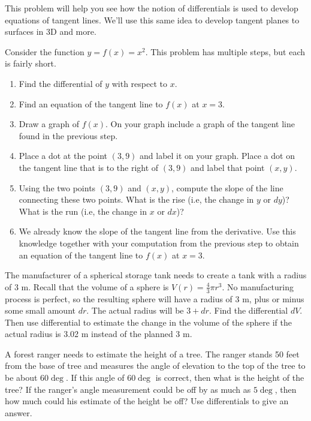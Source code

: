 This problem will help you see how the notion of differentials is used to develop equations of tangent lines. We'll use this same idea to develop tangent planes to surfaces in 3D and more.
\begin{problem} \label{differentials give tangent lines}
Consider the function $y=f(x) = x^2$. This problem has multiple steps, but each is fairly short.
\begin{enumerate}
\item Find the differential of $y$ with respect to $x$.  
\item Find an equation of the tangent line to $f(x)$ at $x=3$. 
\item Draw a graph of $f(x)$. On your graph include a graph of the tangent line found in the previous step. 
\item Place a dot at the point $(3,9)$ and label it on your graph. Place a dot on the tangent line that is to the right of $(3,9)$ and label that point $(x,y)$. 
\item Using the two points $(3,9)$ and $(x,y)$, compute the slope of the line connecting these two points. What is the rise (i.e, the change in $y$ or $dy$)? What is the run (i.e, the change in $x$ or $dx$)?  
\item We already know the slope of the tangent line from the derivative. Use this knowledge together with your computation from the previous step to obtain an equation of the tangent line to $f(x)$ at $x=3$. 
\end{enumerate}
\end{problem}
 
\begin{problem}  \label{diff-sphere}
The manufacturer of a spherical storage tank needs to create a tank with a radius of 3 m. Recall that the volume of a sphere is $V(r) = \frac{4}{3}\pi r^3$. No manufacturing process is perfect, so the resulting sphere will have a radius of 3 m, plus or minus some small amount $dr$. The actual radius will be $3+dr$. Find the differential $dV$.  Then use differential to estimate the change in the volume of the sphere if the actual radius is 3.02 m instead of the planned 3 m.    
\end{problem}
 
\begin{problem}
A forest ranger needs to estimate the height of a tree.  The ranger stands 50 feet from the base of tree and measures the angle of elevation to the top of the tree to be about 60$\deg$. If this angle of 60$\deg$ is correct, then what is the height of the tree? If the ranger's angle measurement could be off by as much as $5 \deg$, then how much could his estimate of the height be off? Use differentials to give an answer.
\end{problem}



